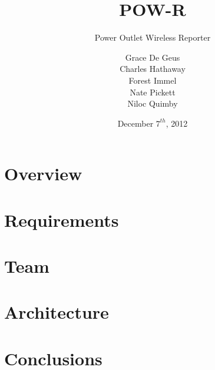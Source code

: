 \documentclass[compress]{beamer}
\title{POW-R}
\subtitle{Power Outlet Wireless Reporter}
\author[]{Grace De Geus\\Charles Hathaway\\Forest Immel\\Nate Pickett\\Niloc Quimby}
\date{December $7^{th}$, 2012}
\begin{document}
\frame{
    \titlepage
}


\section{Overview}


\section{Requirements}


\section{Team}






\section{Architecture}







\section{Conclusions}



\end{document}
